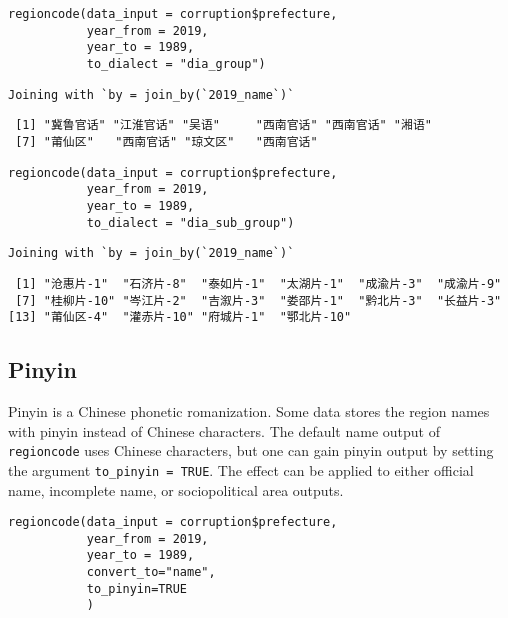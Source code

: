 \documentclass[
  article]{jss}
\begin{document}
\begin{verbatim}
regioncode(data_input = corruption$prefecture, 
           year_from = 2019,
           year_to = 1989,
           to_dialect = "dia_group")
\end{verbatim}

\begin{verbatim}
Joining with `by = join_by(`2019_name`)`
\end{verbatim}

\begin{verbatim}
 [1] "冀鲁官话" "江淮官话" "吴语"     "西南官话" "西南官话" "湘语"    
 [7] "莆仙区"   "西南官话" "琼文区"   "西南官话"
\end{verbatim}

\begin{verbatim}
regioncode(data_input = corruption$prefecture, 
           year_from = 2019,
           year_to = 1989,
           to_dialect = "dia_sub_group")
\end{verbatim}

\begin{verbatim}
Joining with `by = join_by(`2019_name`)`
\end{verbatim}

\begin{verbatim}
 [1] "沧惠片-1"  "石济片-8"  "泰如片-1"  "太湖片-1"  "成渝片-3"  "成渝片-9" 
 [7] "桂柳片-10" "岑江片-2"  "吉溆片-3"  "娄邵片-1"  "黔北片-3"  "长益片-3" 
[13] "莆仙区-4"  "灌赤片-10" "府城片-1"  "鄂北片-10"
\end{verbatim}

\hypertarget{pinyin}{%
\subsection{Pinyin}\label{pinyin}}

Pinyin is a Chinese phonetic romanization. Some data stores the region
names with pinyin instead of Chinese characters. The default name output
of \texttt{regioncode} uses Chinese characters, but one can gain pinyin
output by setting the argument \texttt{to\_pinyin\ =\ TRUE}. The effect
can be applied to either official name, incomplete name, or
sociopolitical area outputs.

\begin{verbatim}
regioncode(data_input = corruption$prefecture, 
           year_from = 2019,
           year_to = 1989, 
           convert_to="name",
           to_pinyin=TRUE
           )
\end{verbatim}
\end{document}
